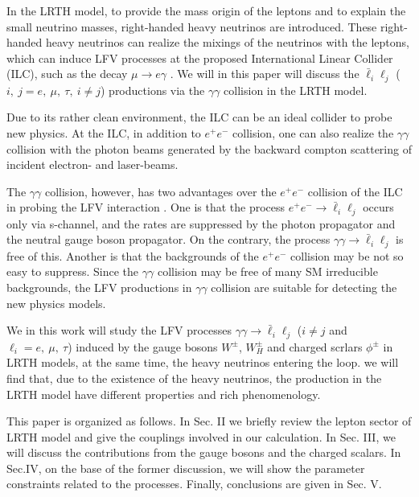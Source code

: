 \documentclass[preprint,aps,12pt,showpacs,nofootinbib,tightenlines]{revtex4}
\begin{document}
In the LRTH model, to provide the mass origin of the leptons and to explain the small neutrino masses,
right-handed heavy neutrinos are introduced. These right-handed heavy neutrinos can realize the mixings of the neutrinos with the leptons,
which can induce LFV processes at the proposed International Linear Collider (ILC)\cite{ilc-project},
such as the decay $\mu\to e \gamma$ \cite{0711.1238}.
We will in this paper will discuss the $\bar \ell_i \ell_j$ ($i,~j= e,~\mu,~\tau,~i\neq j$) productions via the $\gamma\gamma$
collision in the LRTH model.

Due to its rather clean environment, the ILC can be an ideal collider to probe new physics.
At the ILC, in addition to $e^+e^-$ collision, one can also realize the $\gamma\gamma$ collision \cite{rr-project} with the photon
beams generated by the backward compton scattering of incident electron- and laser-beams.

The $\gamma\gamma$ collision, however, has two advantages over the $e^+ e^-$ collision of the ILC in probing
the LFV interaction \cite{rr-advantage,0311166}.  One is that the process
$e^+ e^- \to \bar \ell_i \ell_j$ occurs only via s-channel, and the rates are
suppressed by the photon propagator and the neutral gauge boson
propagator. On the contrary, the process $\gamma \gamma \to \bar \ell_i \ell_j$  is
free of this. Another is that the backgrounds of the $e^+ e^-$ collision
may be not so easy to suppress\cite{rr-advantage}. Since the $\gamma \gamma$ collision
may be free of many SM irreducible backgrounds, the LFV productions in $\gamma\gamma$ collision
are suitable for detecting the new physics models.


We in this work will study the LFV processes $\gamma\gamma\to \bar \ell_i \ell_j$
($i\neq j$ and $\ell_{i} = e,~\mu,~\tau$) induced by the gauge bosons $W^\pm$,  $W_{H}^\pm$ and
charged scrlars $\phi^\pm$ in LRTH models, at the same time, the heavy neutrinos entering the loop.
we will find that, due to the existence of the heavy neutrinos, the production in the LRTH model
have different properties and rich phenomenology.

This paper is organized as follows. In Sec. II we briefly review the lepton sector of LRTH model
and give the couplings involved in our calculation. In Sec. III, we will discuss the contributions
from the gauge bosons and the charged scalars.
In Sec.IV, on the base of the former discussion, we will show the parameter constraints
 related to the processes.
Finally, conclusions are given in Sec. V.
\end{document}
